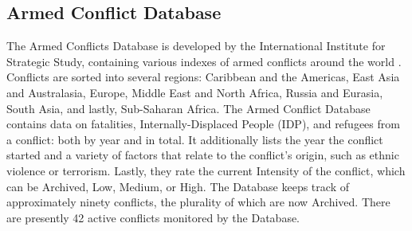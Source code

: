\subsection{Armed Conflict Database}
The Armed Conflicts Database is developed by the International Institute for Strategic Study, containing various indexes of armed conflicts around the world \cite{conflictDB}. Conflicts are sorted into several regions: Caribbean and the Americas, East Asia and Australasia, Europe, Middle East and North Africa, Russia and Eurasia, South Asia, and lastly, Sub-Saharan Africa. The Armed Conflict Database contains data on fatalities, Internally-Displaced People (IDP), and refugees from a conflict: both by year and in total. It additionally lists the year the conflict started and a variety of factors that relate to the conflict's origin, such as ethnic violence or terrorism. Lastly, they rate the current Intensity of the conflict, which can be Archived, Low, Medium, or High. The Database keeps track of approximately ninety conflicts, the plurality of which are now Archived. There are presently 42 active conflicts monitored by the Database.